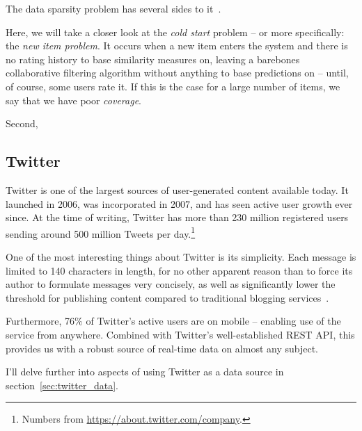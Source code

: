 The data sparsity problem has several sides to it~\cite{Su:2009:SCF:1592474.1722966}.

Here, we will take a closer look at the \emph{cold start} problem -- or more specifically: the \emph{new item problem}. It occurs when a new item enters the system and there is no rating history to base similarity measures on, leaving a barebones collaborative filtering algorithm without anything to base predictions on -- until, of course, some users rate it. If this is the case for a large number of items, we say that we have poor \emph{coverage}.

Second, 

\subsection{Twitter}

Twitter is one of the largest sources of user-generated content available today. It launched in 2006, was incorporated in 2007, and has seen active user growth ever since. At the time of writing, Twitter has more than 230 million registered users sending around 500 million Tweets per day.\footnote{Numbers from \url{https://about.twitter.com/company}.}

One of the most interesting things about Twitter is its simplicity. Each message is limited to 140 characters in length, for no other apparent reason than to force its author to formulate messages very concisely, as well as significantly lower the threshold for publishing content compared to traditional blogging services~\cite{Java:2007:WWT:1348549.1348556}.

Furthermore, 76\% of Twitter's active users are on mobile -- enabling use of the service from anywhere. Combined with Twitter's well-established REST API, this provides us with a robust source of real-time data on almost any subject.

I'll delve further into aspects of using Twitter as a data source in section~\ref{sec:twitter_data}.


